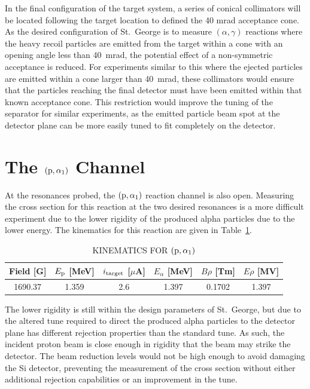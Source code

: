 In the final configuration of the target system, a series of conical
collimators will be located following the target location to defined the
40 mrad acceptance cone. As the desired configuration of St.\ George is
to measure $(\alpha,\gamma)$ reactions where the heavy recoil particles
are emitted from the target within a cone with an opening angle less
than 40~mrad, the potential effect of a non-symmetric acceptance is
reduced. For experiments similar to this where the ejected particles are
emitted within a cone larger than 40~mrad, these collimators would
ensure that the particles reaching the final detector must have been
emitted within that known acceptance cone. This restriction would
improve the tuning of the separator for similar experiments, as the
emitted particle beam spot at the detector plane can be more easily
tuned to fit completely on the detector.


\section{The $({\rm p},\alpha_1)$ Channel}
\label{sec:the-palpha_1-channel}

At the resonances probed, the $({\rm p},\alpha_1)$ reaction channel is
also open. Measuring the cross section for this reaction at the two
desired resonances is a more difficult experiment due to the lower
rigidity of the produced alpha particles due to the lower energy. The
kinematics for this reaction are given in Table~\ref{tab:alpha-one}.

\begin{table}[h]
    \begin{center}
        \caption{KINEMATICS FOR $({\rm p},\alpha_1)$}
        \label{tab:alpha-one}
        \begin{tabular}{cccccc}
            \toprule
            \midrule
            \textbf{Field [G]} & \textbf{$E_{\rm p}$ [MeV]} & \textbf{$i_{\rm target}$ [$\mu$A]} & \textbf{$E_{\alpha}$ [MeV]} & \textbf{$B\rho$ [Tm]} & \textbf{$E\rho$ [MV]} \\
            \midrule
            1690.37 & 1.359 & 2.6 & 1.397 & 0.1702 & 1.397 \\
            \bottomrule
        \end{tabular}
    \end{center}
\end{table}

The lower rigidity is still within the design parameters of St.\ George,
but due to the altered tune required to direct the produced alpha
particles to the detector plane has different rejection properties than
the standard tune. As such, the incident proton beam is close enough in
rigidity that the beam may strike the detector. The beam reduction
levels would not be high enough to avoid damaging the Si detector,
preventing the measurement of the cross section without either
additional rejection capabilities or an improvement in the tune.

